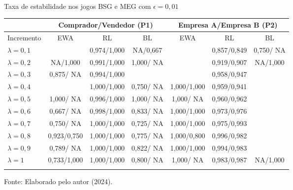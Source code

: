 \begin{tabela}[H]
	\small
	\centering
	\caption{Taxa de estabilidade nos jogos BSG e MEG com $\epsilon = 0,01$}
	\begin{tabular}{l|c c c|c c c}
		\Xhline{2\arrayrulewidth}
		& \multicolumn{3}{c|}{Comprador/Vendedor (P1)} & \multicolumn{3}{c}{Empresa A/Empresa B (P2)} \\ 
		\hline
		Incremento & EWA & RL & BL & EWA & RL & BL \\ \hline
		$\lambda = 0,1$ &  & 0,974/1,000 &   NA/0,667 &  & 0,857/0,849 & 0,750/  NA \\
		$\lambda = 0,2$ &   NA/1,000 & 0,991/1,000 & 1,000/  NA &  & 0,919/0,907 &   NA/1,000 \\
		$\lambda = 0,3$ & 0,875/  NA & 0,994/1,000 &  &  & 0,958/0,947 &  \\
		$\lambda = 0,4$ &  & 1,000/1,000 & 0,750/  NA & 1,000/1,000 & 0,959/0,941 &  \\
		$\lambda = 0,5$ & 1,000/  NA & 0,996/1,000 & 1,000/  NA & 1,000/  NA & 0,960/0,962 &  \\
		$\lambda = 0,6$ & 0,667/  NA & 0,998/1,000 & 0,833/  NA & 1,000/1,000 & 0,973/0,976 &  \\
		$\lambda = 0,7$ & 0,750/  NA & 1,000/1,000 & 0,725/  NA & 1,000/1,000 & 0,975/0,993 &  \\
		$\lambda = 0,8$ & 0,923/0,750 & 1,000/1,000 & 0,775/  NA & 1,000/0,800 & 0,996/0,982 &  \\
		$\lambda = 0,9$ & 0,789/  NA & 1,000/1,000 & 0,822/  NA & 1,000/1,000 & 0,994/0,983 &  \\
		$\lambda = 1$ & 0,733/1,000 & 1,000/1,000 & 0,800/  NA & 1,000/  NA & 0,983/0,987 &   NA/1,000 \\
		\Xhline{2\arrayrulewidth}
	\end{tabular}
	\label{tabela_11}
	\caption*{\fontsize{10}{12}\selectfont Fonte: Elaborado pelo autor (2024).}
\end{tabela}
